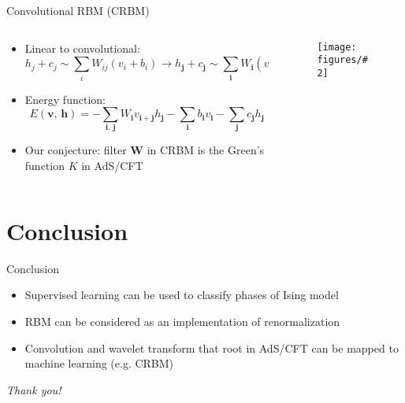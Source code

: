\documentclass[aspectratio=169]{beamer}
\def\bm#1{{\symbf{#1}}}
\newcommand\imageinput[2][]{\texttt{[image: figures/\#2]}}
\def\AdSCFT{AdS/CFT}
\begin{document}
\begin{frame}{Convolutional RBM (CRBM)}
\begin{columns}[t]
  \begin{column}{0.68\textwidth}
    \begin{itemize}
      \item Linear to convolutional:
        \[
          h_j+c_j \sim \sum_i W_{ij} (v_i+b_i) \to
          h_{\bm{j}} + c_{\bm{j}} \sim
            \sum_{\bm{i}} W_{\bm{i}} (v_{\bm{i}+\bm{j}} + b_{\bm{i}+\bm{j}})
        \]
      \item Energy function:
        \[
          E(\bm{v},\,\bm{h})
          = - \sum_{\bm{i},\,\bm{j}} W_{\bm{i}} v_{\bm{i}+\bm{j}} h_{\bm{j}}
            - \sum_{\bm{i}} b_{\bm{i}} v_{\bm{i}} - \sum_{\bm{j}} c_{\bm{j}} h_{\bm{j}}
        \]
      \item Our conjecture: filter $\bm{W}$ in CRBM is the Green's function $K$ in \AdSCFT{}
    \end{itemize}
  \end{column}
  \begin{column}{0.3\textwidth}
    \begin{figure}
      \centering
      \imageinput[width=\textwidth]{crbm.pdf}
    \end{figure}
  \end{column}
\end{columns}
\end{frame}

\section{Conclusion}

\begin{frame}{Conclusion}
\begin{itemize}
  \item Supervised learning can be used to classify phases of Ising model
  \item RBM can be considered as an implementation of renormalization
  \item Convolution and wavelet transform that root in \AdSCFT{} can be mapped to
    machine learning (e.g. CRBM)
\end{itemize}
\end{frame}

\begin{frame}[standout]
\LARGE\itshape
Thank you!
\end{frame}
\end{document}
